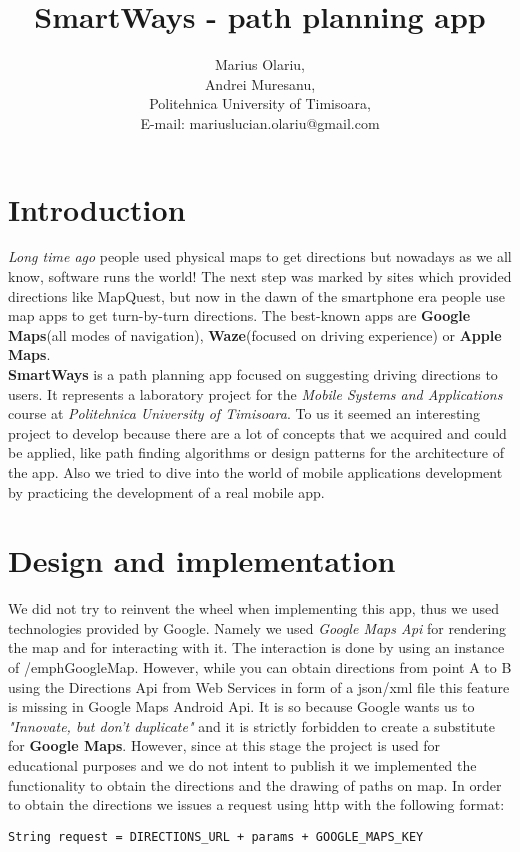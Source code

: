 \documentclass[11,titlepage]{article}
\begin{document}
\title{SmartWays - path planning app}
\author{Marius Olariu,\\
        Andrei Muresanu,\\
        Politehnica University of Timisoara,\\
        E-mail: mariuslucian.olariu@gmail.com}
\date{}
\maketitle

\tableofcontents
\newpage

\section{Introduction}
	\emph{Long time ago} people used physical maps to get directions but nowadays as we all know, software runs the world! The next step was marked by sites which provided directions like MapQuest, but now in the dawn of the smartphone era people use map apps to get turn-by-turn directions. The best-known apps are \textbf{Google Maps}(all modes of navigation), \textbf{Waze}(focused on driving experience) or \textbf{Apple Maps}. \\
	
	\textbf{SmartWays} is a path planning app focused on suggesting driving directions to users. It  represents a laboratory project for the \emph{Mobile Systems and Applications} course at \emph{Politehnica University of Timisoara}.
To us it seemed an interesting project to develop because there are a lot of concepts that we acquired and could be applied, like path finding algorithms or design patterns for the architecture of the app. Also we tried to dive into the world of mobile applications development by practicing the development of a real mobile app.

	
\section{D​esign and implementation}
	We did not try to reinvent the wheel when implementing this app, thus we used technologies provided by Google. Namely we used \emph{Google Maps Api} for rendering the map and for interacting with it. The interaction is done by using an instance of /emph{GoogleMap}. However, while you can obtain directions from point A to B using the Directions Api from Web Services in form of a json/xml file this feature is missing in Google Maps Android Api. It is so because Google wants us to \emph{"Innovate, but don't duplicate"} and it is strictly forbidden to create a substitute for \textbf{Google Maps}. However, since at this stage the project is used for educational purposes and we do not intent to publish it we implemented the functionality to obtain the directions and the drawing of paths on map. In order to obtain the directions we issues a request using http with the following format: \\
	\begin{lstlisting}[style=Java]
  String request = DIRECTIONS_URL + params + GOOGLE_MAPS_KEY
	\end{lstlisting}
\end{document}

